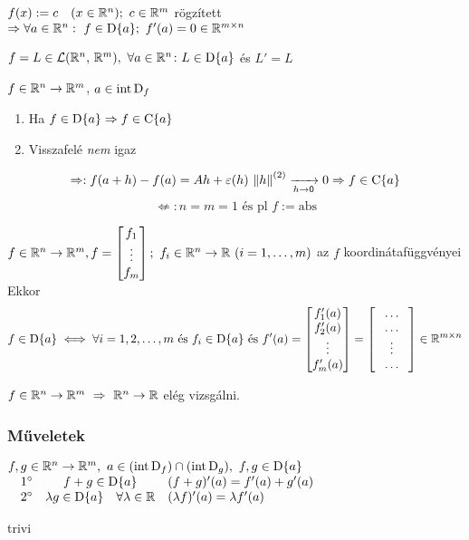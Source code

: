 \begin{Pl}
\item $f(x):=c\quad(x\in\mathbb{R}^n);\ c\in\mathbb{R}^m$ rögzített $\nn \forall a\in\R^n:\ f\in\der{a};\ f'(a)=0\in\Rmn$
\item $f=L\in\mathcal{L}(\mathbb{R}^n,\,\mathbb{R}^m),\ \forall a\in\mathbb{R}^n\colon L\in\operatorname{D}\{a\}$ és $L'=L$
\end{Pl}

\begin{te}
  $f\in\mathbb{R}^n\to\mathbb{R}^m$, $a\in\operatorname{int\,D}_f$
  \begin{enumerate}
    \item Ha $f\in\operatorname{D}\{a\}\Rightarrow f\in\operatorname{C}\{a\}$
    \item Visszafelé \emph{nem} igaz
  \end{enumerate}
\end{te}
\begin{biz}
  \[\Rightarrow: f(a+h) -f(a) = Ah + \varepsilon(h)\,\left\Vert h\right\Vert^{(2)}\xrightarrow[h\to\mathsf{0}]{}0 \Rightarrow f\in\operatorname{C}\{a\}\]
  \[\not\Leftarrow: n=m=1 \text{ és pl } f := \mathrm{abs}\]
\end{biz}

\begin{te}
  $f\in\RnRm, f=\begin{bmatrix}f_1\\\vdots\\f_m\end{bmatrix};\ f_i\in\RnR\ (i=1,\dotsc,m)$ az $f$
  koordinátafüggvényei\\
Ekkor
\[f\in\operatorname{D}\{a\} \iff \forall i = 1,2,\dotsc,m\text{ és } f_i\in\operatorname{D}\{a\} \text{ és } f'(a)= \begin{bmatrix}f_1'(a) \\
  f_2'(a) \\
  \vdots\\ f_m'(a)\end{bmatrix} = \begin{bmatrix}\hspace{0.8em}\dots\hspace{0.8em}\\\dots\\\vdots\\\dots
\end{bmatrix}\in\mathbb{R}^{m\times n}\]
\end{te}

\begin{megj} $f\in\mathbb{R}^n\to\mathbb{R}^m\ \Rightarrow\ \mathbb{R}^n\to\mathbb{R}$ elég vizsgálni.
\end{megj}
\subsubsection{Műveletek}
\begin{te}$f,g\in\RnRm,\ a\in(\intD_f)\cap(\intD_g),\ f,g\in\der a$\\
  $\begin{array}{@{\quad}rcl}
    1^\circ &  f+g\in\der a & (f+g)'(a) = f'(a) + g'(a)\\
    2^\circ &  \lambda g\in\der a\quad \forall \lambda\in\R & (\lambda f)'(a) = \lambda f'(a)
  \end{array}$
\end{te}
\begin{biz}
  trivi
\end{biz}

